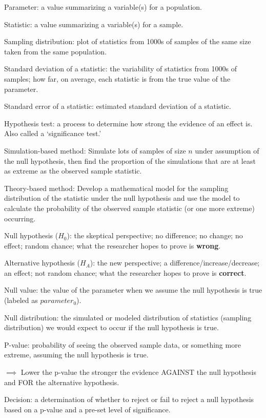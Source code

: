 \documentclass[
]{report}
\begin{document}
Parameter: a value summarizing a variable(s) for a population.

Statistic: a value summarizing a variable(s) for a sample.

Sampling distribution: plot of statistics from 1000s of samples of the same size taken from the same population.

Standard deviation of a statistic: the variability of statistics from 1000s of samples; how far, on average, each statistic is from the true value of the parameter.

Standard error of a statistic: estimated standard deviation of a statistic.

Hypothesis test: a process to determine how strong the evidence of an effect is. Also called a `significance test.'

Simulation-based method: Simulate lots of samples of size \(n\) under assumption of the null hypothesis, then find the proportion of the simulations that are at least as extreme as the observed sample statistic.

Theory-based method: Develop a mathematical model for the sampling distribution of the statistic under the null hypothesis and use the model to calculate the probability of the observed sample statistic (or one more extreme) occurring.

Null hypothesis (\(H_0\)): the skeptical perspective; no difference; no change; no effect; random chance; what the researcher hopes to prove is \textbf{wrong}.

Alternative hypothesis (\(H_A\)): the new perspective; a difference/increase/decrease; an effect; not random chance; what the researcher hopes to prove is \textbf{correct}.

Null value: the value of the parameter when we assume the null hypothesis is true (labeled as \(parameter_0\)).

Null distribution: the simulated or modeled distribution of statistics (sampling distribution) we would expect to occur if the null hypothesis is true.

P-value: probability of seeing the observed sample data, or something more extreme, assuming the null hypothesis is true.

\(\implies\) Lower the p-value the stronger the evidence AGAINST the null hypothesis and FOR the alternative hypothesis.

Decision: a determination of whether to reject or fail to reject a null hypothesis based on a p-value and a pre-set level of significance.
\end{document}
